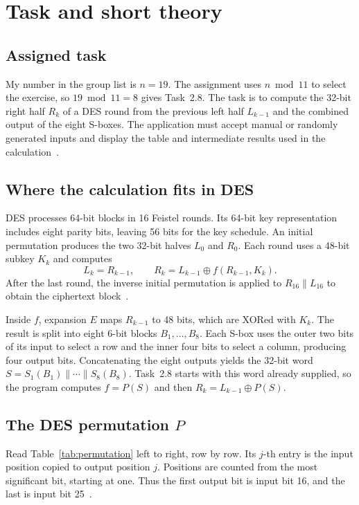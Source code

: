 \documentclass{tum_report}
\begin{document}

\clearpage
{}
\tableofcontents
\thispagestyle{empty}
\clearpage

\chapter{Task and short theory}
\section{Assigned task}
My number in the group list is $n=19$. The assignment uses $n\bmod11$ to
select the exercise, so $19\bmod11=8$ gives Task~2.8. The task is to compute
the 32-bit right half $R_k$ of a DES round from the previous left half
$L_{k-1}$ and the combined output of the eight S-boxes. The application must
accept manual or randomly generated inputs and display the table and
intermediate results used in the calculation~\cite{ref:assignment}.

\section{Where the calculation fits in DES}
DES processes 64-bit blocks in 16 Feistel rounds. Its 64-bit key representation
includes eight parity bits, leaving 56 bits for the key schedule. An initial
permutation produces the two 32-bit halves $L_0$ and $R_0$. Each round uses a
48-bit subkey $K_k$ and computes
\[
L_k=R_{k-1}, \qquad R_k=L_{k-1}\oplus f(R_{k-1},K_k).
\]
After the last round, the inverse initial permutation is applied to
$R_{16}\|L_{16}$ to obtain the ciphertext block~\cite{ref:fips}.

Inside $f$, expansion $E$ maps $R_{k-1}$ to 48 bits, which are XORed with
$K_k$. The result is split into eight 6-bit blocks $B_1,\ldots,B_8$.
Each S-box uses the outer two bits of its input to select a row and
the inner four bits to select a column, producing four output bits.
Concatenating the eight outputs yields the 32-bit word
$S=S_1(B_1)\|\cdots\|S_8(B_8)$. Task~2.8 starts with this word already supplied,
so the program computes $f=P(S)$ and then $R_k=L_{k-1}\oplus P(S)$.

\section{The DES permutation \texorpdfstring{$P$}{P}}
Read Table~\ref{tab:permutation} left to right, row by row. Its $j$-th entry
is the input position copied to output position $j$. Positions are counted
from the most significant bit, starting at one. Thus the first output
bit is input bit 16, and the last is input bit 25~\cite{ref:fips}.
\end{document}
